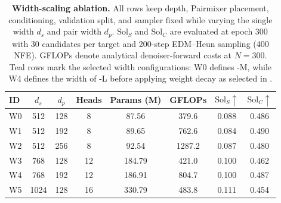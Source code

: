 
\begin{table}[!t]
\centering
\caption{\textbf{Width-scaling ablation.}
All rows keep depth, Pairmixer placement, conditioning, validation split, and
sampler fixed while varying the single width $d_s$ and pair width $d_p$.
$\mathrm{Sol}_S$ and $\mathrm{Sol}_C$ are evaluated at epoch 300 with 30
candidates per target and 200-step EDM--Heun sampling (400 NFE). GFLOPs denote
analytical denoiser-forward costs at $N{=}300$. Teal rows mark the selected width
configurations: W0 defines \model{}-M, while W4 defines the width of \model{}-L
before applying weight decay as selected in .}
\label{tab:width_scaling_ablation}
\small
\begin{tabular}{@{}lccccccc@{}}
\toprule
ID & $d_s$ & $d_p$ & Heads & Params (M) & GFLOPs &
$\mathrm{Sol}_S \uparrow$ & $\mathrm{Sol}_C \uparrow$ \\
\midrule
\rowcolor{mfTealFill}
W0 & 512 & 128 & 8 & 87.56 & 379.6 & 0.088 & 0.486 \\
W1 & 512 & 192 & 8 & 89.65 & 762.6 & 0.084 & 0.490 \\
W2 & 512 & 256 & 8 & 92.54 & 1287.2 & 0.087 & 0.480 \\
W3 & 768 & 128 & 12 & 184.79 & 421.0 & 0.100 & 0.462 \\
\rowcolor{mfTealFill}
W4 & 768 & 192 & 12 & 186.91 & 804.7 & 0.100 & 0.487 \\
W5 & 1024 & 128 & 16 & 330.79 & 483.8 & 0.111 & 0.454 \\
\bottomrule
\end{tabular}
\end{table}
